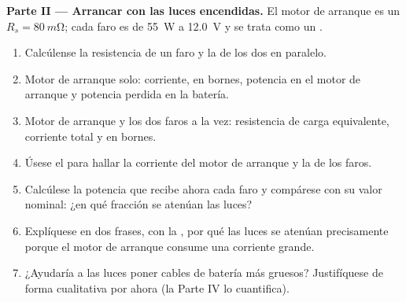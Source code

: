 \begin{problem}
\medskip
\noindent\textbf{Parte II --- Arrancar con las luces encendidas.}
El motor de arranque es un  $R_s = \qty{80}{m\ohm}$; cada faro es
de \qty{55}{W} a \qty{12.0}{V} y se trata como un .
\begin{enumerate}[resume]
  \item Calcúlense la resistencia de un faro y la de los dos en paralelo.
  \item Motor de arranque solo: corriente,  en bornes, potencia en
        el motor de arranque y potencia perdida en la batería.
  \item Motor de arranque y los dos faros a la vez: resistencia de carga
        equivalente, corriente total y  en bornes.
  \item Úsese el  para hallar la corriente del motor
        de arranque y la de los faros.
  \item Calcúlese la potencia que recibe ahora cada faro y compárese con
        su valor nominal: ¿en qué fracción se atenúan las luces?
  \item Explíquese en dos frases, con la , por qué las
        luces se atenúan precisamente porque el motor de arranque consume
        una corriente grande.
  \item ¿Ayudaría a las luces poner cables de batería más gruesos?
        Justifíquese de forma cualitativa por ahora (la Parte IV lo
        cuantifica).
\end{enumerate}


\end{problem}
